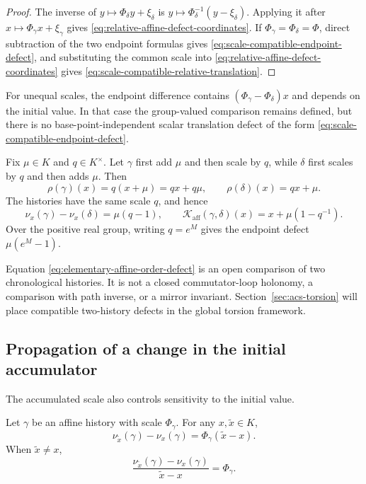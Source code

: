 \begin{proof}
The inverse of $y\mapsto\Phi_\delta y+\xi_\delta$ is
$y\mapsto\Phi_\delta^{-1}(y-\xi_\delta)$.  Applying it after
$x\mapsto\Phi_\gamma x+\xi_\gamma$ gives
\eqref{eq:relative-affine-defect-coordinates}.  If
$\Phi_\gamma=\Phi_\delta=\Phi$, direct subtraction of the two endpoint formulas
gives \eqref{eq:scale-compatible-endpoint-defect}, and substituting the common
scale into \eqref{eq:relative-affine-defect-coordinates} gives
\eqref{eq:scale-compatible-relative-translation}.
\end{proof}

For unequal scales, the endpoint difference contains
$(\Phi_\gamma-\Phi_\delta)x$ and depends on the initial value.  In that case the
group-valued comparison remains defined, but there is no base-point-independent
scalar translation defect of the form
\eqref{eq:scale-compatible-endpoint-defect}.

\begin{example}
\label{ex:elementary-affine-order-defect}
Fix $\mu\in K$ and $q\in K^\times$.  Let $\gamma$ first add $\mu$ and then
scale by $q$, while $\delta$ first scales by $q$ and then adds $\mu$.  Then
\[
  \rho(\gamma)(x)=q(x+\mu)=qx+q\mu,
  \qquad
  \rho(\delta)(x)=qx+\mu.
\]
The histories have the same scale $q$, and hence
\begin{equation}
  \nu_x(\gamma)-\nu_x(\delta)=\mu(q-1),
  \qquad
  \mathcal K_{\mathrm{aff}}(\gamma,\delta)(x)
  =x+\mu(1-q^{-1}).
  \label{eq:elementary-affine-order-defect}
\end{equation}
Over the positive real group, writing $q=e^M$ gives the endpoint defect
$\mu(e^M-1)$.
\end{example}

Equation \eqref{eq:elementary-affine-order-defect} is an open comparison of two
chronological histories.  It is not a closed commutator-loop holonomy, a
comparison with path inverse, or a mirror invariant.  Section~\ref{sec:acs-torsion}
will place compatible two-history defects in the global torsion framework.

\subsection{Propagation of a change in the initial accumulator}

The accumulated scale also controls sensitivity to the initial value.

\begin{proposition}
\label{prop:affine-perturbation-propagation}
Let $\gamma$ be an affine history with scale $\Phi_\gamma$.  For any
$x,\widetilde x\in K$,
\begin{equation}
  \nu_{\widetilde x}(\gamma)-\nu_x(\gamma)
  =\Phi_\gamma(\widetilde x-x).
  \label{eq:exact-affine-perturbation}
\end{equation}
When $\widetilde x\ne x$,
\begin{equation}
  \frac{\nu_{\widetilde x}(\gamma)-\nu_x(\gamma)}
       {\widetilde x-x}
  =\Phi_\gamma.
  \label{eq:affine-perturbation-ratio}
\end{equation}
\end{proposition}

